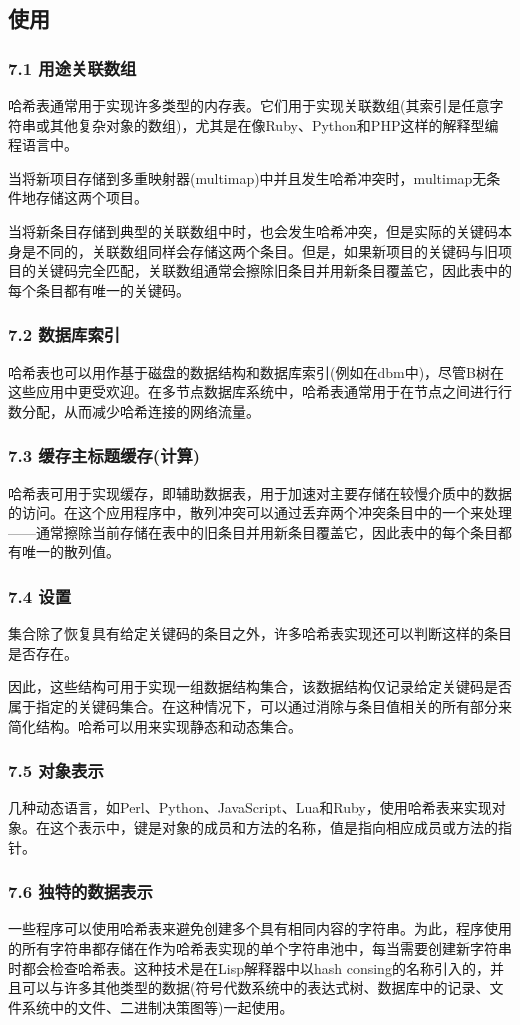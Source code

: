 \subsection{使用}
\subsubsection{7.1 用途关联数组}
哈希表通常用于实现许多类型的内存表。它们用于实现关联数组(其索引是任意字符串或其他复杂对象的数组)，尤其是在像Ruby、Python和PHP这样的解释型编程语言中。

当将新项目存储到多重映射器(multimap)中并且发生哈希冲突时，multimap无条件地存储这两个项目。

当将新条目存储到典型的关联数组中时，也会发生哈希冲突，但是实际的关键码本身是不同的，关联数组同样会存储这两个条目。但是，如果新项目的关键码与旧项目的关键码完全匹配，关联数组通常会擦除旧条目并用新条目覆盖它，因此表中的每个条目都有唯一的关键码。
\subsubsection{7.2 数据库索引}
哈希表也可以用作基于磁盘的数据结构和数据库索引(例如在dbm中)，尽管B树在这些应用中更受欢迎。在多节点数据库系统中，哈希表通常用于在节点之间进行行数分配，从而减少哈希连接的网络流量。
\subsubsection{7.3 缓存主标题缓存(计算)}
哈希表可用于实现缓存，即辅助数据表，用于加速对主要存储在较慢介质中的数据的访问。在这个应用程序中，散列冲突可以通过丢弃两个冲突条目中的一个来处理——通常擦除当前存储在表中的旧条目并用新条目覆盖它，因此表中的每个条目都有唯一的散列值。
\subsubsection{7.4 设置}
集合除了恢复具有给定关键码的条目之外，许多哈希表实现还可以判断这样的条目是否存在。

因此，这些结构可用于实现一组数据结构集合，该数据结构仅记录给定关键码是否属于指定的关键码集合。在这种情况下，可以通过消除与条目值相关的所有部分来简化结构。哈希可以用来实现静态和动态集合。
\subsubsection{7.5 对象表示}
几种动态语言，如Perl、Python、JavaScript、Lua和Ruby，使用哈希表来实现对象。在这个表示中，键是对象的成员和方法的名称，值是指向相应成员或方法的指针。
\subsubsection{7.6 独特的数据表示}
一些程序可以使用哈希表来避免创建多个具有相同内容的字符串。为此，程序使用的所有字符串都存储在作为哈希表实现的单个字符串池中，每当需要创建新字符串时都会检查哈希表。这种技术是在Lisp解释器中以hash consing的名称引入的，并且可以与许多其他类型的数据(符号代数系统中的表达式树、数据库中的记录、文件系统中的文件、二进制决策图等)一起使用。

